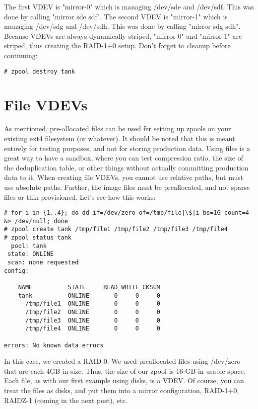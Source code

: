 \documentclass{book}
\begin{document}
The first VDEV is "mirror-0" which is managing /dev/sde and /dev/sdf. This was
done by calling "mirror sde sdf". The second VDEV is "mirror-1" which is
managing /dev/sdg and /dev/sdh. This was done by calling "mirror sdg sdh".
Because VDEVs are always dynamically striped, "mirror-0" and "mirror-1" are
striped, thus creating the RAID-1+0 setup. Don't forget to cleanup before
continuing:

\begin{lstlisting}
# zpool destroy tank
\end{lstlisting}

\section{File VDEVs}
As mentioned, pre-allocated files can be used fer setting up zpools on your
existing ext4 filesystem (or whatever). It should be noted that this is meant
entirely for testing purposes, and not for storing production data. Using files
is a great way to have a sandbox, where you can test compression ratio, the
size of the deduplication table, or other things without actually committing
production data to it. When creating file VDEVs, you cannot use relative paths,
but must use absolute paths. Further, the image files must be preallocated, and
not sparse files or thin provisioned. Let's see how this works:

\begin{lstlisting}
# for i in {1..4}; do dd if=/dev/zero of=/tmp/file|\$|i bs=1G count=4 &> /dev/null; done
# zpool create tank /tmp/file1 /tmp/file2 /tmp/file3 /tmp/file4
# zpool status tank
  pool: tank
 state: ONLINE
 scan: none requested
config:

    NAME          STATE     READ WRITE CKSUM
    tank          ONLINE       0     0     0
      /tmp/file1  ONLINE       0     0     0
      /tmp/file2  ONLINE       0     0     0
      /tmp/file3  ONLINE       0     0     0
      /tmp/file4  ONLINE       0     0     0

errors: No known data errors
\end{lstlisting}

In this case, we created a RAID-0. We used preallocated files using
/dev/zero that are each 4GB in size. Thus, the size of our zpool is 16 GB
in usable space. Each file, as with our first example using disks, is a
VDEV. Of course, you can treat the files as disks, and put them into a
mirror configuration, RAID-1+0, RAIDZ-1 (coming in the next post), etc.
\end{document}
